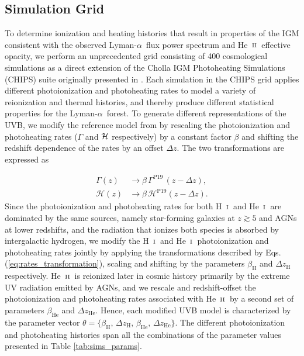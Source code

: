 \documentclass[twocolumn]{aastex62}
\newcommand\Lya{Lyman-$\alpha$}
\def\HI{\hbox{\rm H~$\scriptstyle\rm I$}}
\def\HeI{\hbox{He~$\scriptstyle\rm I$}}
\def\HeII{\hbox{He~$\scriptstyle\rm II$}}
\begin{document}
\subsection{Simulation Grid}\label{sec:sim_grid}

To determine ionization and heating histories that result in properties of the IGM consistent with the observed \Lya\ flux power spectrum and \HeII\ effective opacity, we perform an unprecedented grid consisting of 400 cosmological simulations as a direct extension of the Cholla IGM Photoheating 
Simulations (CHIPS) suite originally presented in \cite{villasenor2021a}. Each simulation in the CHIPS grid applies different photoionization and photoheating 
rates to model a variety of reionization and thermal histories, and thereby produce different statistical properties for the \Lya\ forest. 
To generate different representations of the UVB, we modify the reference model from \cite{puchwein2019a} by rescaling the photoionization  and photoheating  
rates ($\Gamma$ and $\cal{H}$ respectively) by a constant factor $\beta$ and shifting the redshift dependence of the rates by an offset $\Delta z$. The two 
transformations are expressed as


\begin{equation}
\begin{aligned}
\Gamma(z) &\rightarrow \beta \, \Gamma^{\mathrm{P19}}\,( z  - \Delta z), \\ 
\mathcal{H}(z) & \rightarrow \beta \, \mathcal{H}^{\mathrm{P19}}( z - \Delta z).
\end{aligned}
\label{eq:rates_transformation}
\end{equation}
%
Since the photoionization and photoheating rates for both \HI\ and \HeI\ are dominated  by the same sources, namely star-forming galaxies at $z\gtrsim 5$ and AGNs at lower redshifts, and the radiation that ionizes both species is absorbed by intergalactic hydrogen, we modify the \HI\ and \HeI\ photoionization and photoheating rates jointly by applying the transformations described by Eqs. (\ref{eq:rates_transformation}), 
scaling and shifting by the parameters $\beta_{\mathrm{H}}$ and $\Delta z_{\mathrm{H}}$ respectively. 
\HeII\ is reionized later in cosmic history primarily by 
the extreme UV radiation emitted by AGNs, and
we rescale and redshift-offset the photoionization and photoheating rates associated with \HeII\ by a
second set of parameters 
$\beta_{\mathrm{He}}$ and $\Delta z_{\mathrm{He}}$.  Hence, each modified 
UVB model is characterized by the parameter vector 
$\theta= \{ \beta_{\mathrm{H}}, \,\Delta z_{\mathrm{H}}, \, \beta_{\mathrm{He}}, \,\Delta z_{\mathrm{He}} \} $.
The different photoionization and photoheating histories span
all the combinations of the parameter values presented in Table \ref{tab:sims_params}. 
\end{document}
